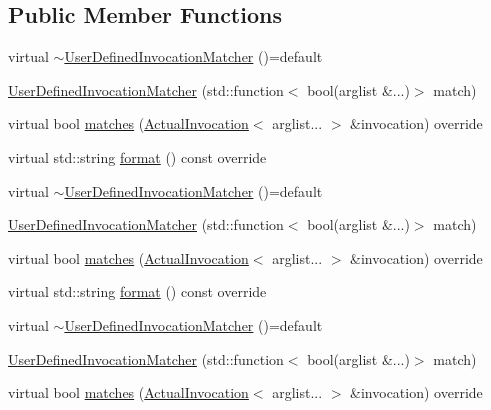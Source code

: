 \subsection*{Public Member Functions}
\begin{DoxyCompactItemize}
\item 
virtual \mbox{\hyperlink{structfakeit_1_1UserDefinedInvocationMatcher_a4bf5571d7a4cac54d1cad8aad72ae638}{$\sim$\+User\+Defined\+Invocation\+Matcher}} ()=default
\item 
\mbox{\hyperlink{structfakeit_1_1UserDefinedInvocationMatcher_a99e448ddbbf9e200f34e80b745ec4ad0}{User\+Defined\+Invocation\+Matcher}} (std\+::function$<$ bool(arglist \&...)$>$ match)
\item 
virtual bool \mbox{\hyperlink{structfakeit_1_1UserDefinedInvocationMatcher_a52f5b5e7de4484b7e9fecb166f6b80e2}{matches}} (\mbox{\hyperlink{structfakeit_1_1ActualInvocation}{Actual\+Invocation}}$<$ arglist... $>$ \&invocation) override
\item 
virtual std\+::string \mbox{\hyperlink{structfakeit_1_1UserDefinedInvocationMatcher_a8090f8ab0af9c775f833e725f4414368}{format}} () const override
\item 
virtual \mbox{\hyperlink{structfakeit_1_1UserDefinedInvocationMatcher_a4bf5571d7a4cac54d1cad8aad72ae638}{$\sim$\+User\+Defined\+Invocation\+Matcher}} ()=default
\item 
\mbox{\hyperlink{structfakeit_1_1UserDefinedInvocationMatcher_a99e448ddbbf9e200f34e80b745ec4ad0}{User\+Defined\+Invocation\+Matcher}} (std\+::function$<$ bool(arglist \&...)$>$ match)
\item 
virtual bool \mbox{\hyperlink{structfakeit_1_1UserDefinedInvocationMatcher_a52f5b5e7de4484b7e9fecb166f6b80e2}{matches}} (\mbox{\hyperlink{structfakeit_1_1ActualInvocation}{Actual\+Invocation}}$<$ arglist... $>$ \&invocation) override
\item 
virtual std\+::string \mbox{\hyperlink{structfakeit_1_1UserDefinedInvocationMatcher_a8090f8ab0af9c775f833e725f4414368}{format}} () const override
\item 
virtual \mbox{\hyperlink{structfakeit_1_1UserDefinedInvocationMatcher_a4bf5571d7a4cac54d1cad8aad72ae638}{$\sim$\+User\+Defined\+Invocation\+Matcher}} ()=default
\item 
\mbox{\hyperlink{structfakeit_1_1UserDefinedInvocationMatcher_a99e448ddbbf9e200f34e80b745ec4ad0}{User\+Defined\+Invocation\+Matcher}} (std\+::function$<$ bool(arglist \&...)$>$ match)
\item 
virtual bool \mbox{\hyperlink{structfakeit_1_1UserDefinedInvocationMatcher_a52f5b5e7de4484b7e9fecb166f6b80e2}{matches}} (\mbox{\hyperlink{structfakeit_1_1ActualInvocation}{Actual\+Invocation}}$<$ arglist... $>$ \&invocation) override

\end{DoxyCompactItemize}

